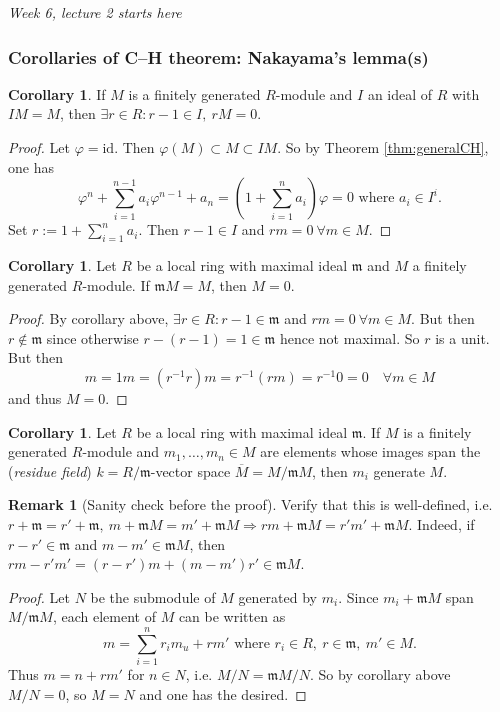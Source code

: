 \documentclass[a4paper]{article}
\newcommand{\m}{\mathfrak m}
\newcommand{\id}{\text{id}}
\theoremstyle{definition}
\newtheorem{coro}[defn]{Corollary}
\newtheorem*{remark}{Remark}
\begin{document}
\begin{flushright}
\textit{Week 6, lecture 2 starts here}
\end{flushright}

\subsubsection{Corollaries of C–H theorem: Nakayama's lemma(s)}
\begin{coro}
If $M$ is a finitely generated $R$-module and $I$ an ideal of $R$ with $IM=M$, then $\exists r\in R:r-1\in I,\ rM=0$.
\end{coro}
\begin{proof}
Let $\varphi=\id$. Then $\varphi(M)\subset M\subset IM$. So by Theorem \ref{thm:generalCH}, one has
\[
\varphi^n + \sum_{i=1}^{n-1}a_i\varphi^{n-1}+a_n=\left(1+\sum_{i=1}^n a_i\right)\varphi=0\text{ where }a_i\in I^i.
\]
Set $r:=1+\sum_{i=1}^n a_i$. Then $r-1\in I$ and $rm=0 \ \forall m\in M$. 
\end{proof}

\begin{coro}
Let $R$ be a local ring with maximal ideal $\m$ and $M$ a finitely generated $R$-module. If $\m M=M$, then $M=0$.
\end{coro}
\begin{proof}
By corollary above, $\exists r\in R:r-1\in\m$ and $rm=0 \ \forall m\in M$. But then $r\notin \m$ since otherwise $r-(r-1)=1\in\m$ hence not maximal. So $r$ is a unit. But then
\[
m=1m=\left(r^{-1}r\right)m =r^{-1} (rm)=r^{-1}0=0 \quad \forall m\in M
\]
and thus $M=0$.
\end{proof}

\begin{coro}
Let $R$ be a local ring with maximal ideal $\m$. If $M$ is a finitely generated $R$-module and $m_1,\ldots,m_n\in M$ are elements whose images span the (\textit{residue field}) $k=R/\m$-vector space $\overline M=M/\m M$, then $m_i$ generate $M$.
\end{coro}
\begin{remark}[Sanity check before the proof]
Verify that this is well-defined, i.e. $r+\m=r'+\m,\ m+\m M=m'+\m M \Rightarrow rm+\m M=r'm'+\m M$. Indeed, if $r-r'\in\m$ and $m-m'\in\m M$, then $rm-r'm'=(r-r')m+(m-m')r'\in \m M$.
\end{remark}
\begin{proof}
Let $N$ be the submodule of $M$ generated by $m_i$. Since $m_i+\m M$ span $M/\m M$, each element of $M$ can be written as
\[
m=\sum_{i=1}^n r_i m_u + rm'\text{ where } r_i\in R,\ r\in \m,\ m'\in M.
\]
Thus $m=n+rm'$ for $n\in N$, i.e. $M/N=\m M/N$. So by corollary above $M/N=0$, so $M=N$ and one has the desired.
\end{proof}
\end{document}
